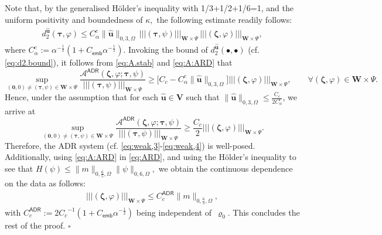 \documentclass[11pt, reqno, a4paper, twoside]{article}
\newcommand*\tnorm[1]{|\!|\!| #1 |\!|\!|}
\newcommand{\bu}{\boldsymbol{u}}
\newcommand\bzeta{\boldsymbol{\zeta}}
\newcommand\bzero{\boldsymbol{0}}
\newcommand\btau{\boldsymbol{\tau}}
\newcommand{\bW}{\mathbf{W}}
\newcommand{\bV}{\mathbf{V}}
\newenvironment{proof}{\noindent{\it Proof.}}{\hfill$\square$}
\numberwithin{equation}{section}
\numberwithin{remark}{section}
\numberwithin{figure}{section}
\numberwithin{table}{section}
\begin{document}
{\begin{proof}
Note that, by the generalised Hölder's inequality with {1/3+1/2+1/6=1}, and the uniform positivity and boundedness of $\kappa,$ the following estimate readily follows:\begin{align}\label{eq:d2.bound}
d_2^{\hat{\bu}}(\btau,\varphi)\leq C^c_{\alpha}\|\hat{\bu}\|_{0,3,\Omega}\,\tnorm{(\btau,\psi)}_{\bW\times\Psi}\,\tnorm{(\bzeta,\varphi)}_{\bW\times\Psi},\end{align} where {$C^c_{\alpha}:={{\alpha^{-\frac12}}}(1+C_{\mathsf{emb}}\alpha^{-\frac12}).$}  
Invoking the bound of \(d_2^{\hat{\bu}}(\bullet,\bullet)\) (cf. \eqref{eq:d2.bound}), it follows from \eqref{eq:A.stab} and \eqref{eq:A:ARD} that
\[\sup_{(\bzero,0)\neq(\btau,\psi)\in {\bW\times\Psi}}\frac{\mathcal{A}^{\mathsf{ADR}}(\bzeta,\varphi;\btau,\psi)}{\tnorm{(\btau,\psi)}_{\bW\times\Psi}}\geq\bigl[C_c-C^c_{\alpha}{\|\hat{\bu}\|_{0,3,\Omega}}\bigr]\tnorm{(\bzeta,\varphi)}_ {\bW\times\Psi}, \qquad  \forall(\bzeta,\varphi)\in \bW\times \Psi.\]
Hence, under the assumption that { for each $\hat{\bu} \in \bV$ such that  {$\|\hat{\bu}\|_{{0,3,\Omega}}\leq \frac{C_c}{2C^c_{\alpha}}$}, we arrive at 
\begin{equation}\label{eq:ARD}
\sup_{(\bzero,0)\neq(\btau,\psi)\in {\bW\times\Psi}}\frac{\mathcal{A}^{\mathsf{ADR}}(\bzeta,\varphi;\btau,\psi)}{\tnorm{(\btau,\psi)}_ {\bW\times\Psi}}\geq\frac{C_c}{2} \tnorm{(\bzeta,\varphi)}_ {\bW\times\Psi}.
\end{equation}
Therefore,} the ADR system (cf. \eqref{eq:weak,3}-\eqref{eq:weak,4}) is well-posed. 
Additionally, using \eqref{eq:A:ARD} in \eqref{eq:ARD}, and using the H\"{o}lder's inequality to see that \(H(\psi)\leq\|m\|_{0,\frac65,\Omega}\|\psi\|_{0,6,\Omega},\) we obtain the continuous dependence on the data as follows: \begin{align}\label{eq:C.c.ard}
\tnorm{(\bzeta,\varphi)}_{\bW\times \Psi}\leq C^{\mathsf{ADR}}_{c}\|m\|_{0,\frac65,\Omega},
\end{align} with {$C^{\mathsf{ADR}}_{c}:={2}{C_c}^{-1}(1+C_{\mathsf{emb}}\alpha^{-\frac12})$} being independent of~\(\varrho_0\). This concludes the rest of the proof.
\end{proof}

}
\end{document}
